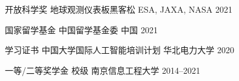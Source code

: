 


\begin{cvhonors}

  \cvhonor
    {开放科学奖} %
    {地球观测仪表板黑客松} %
    {ESA, JAXA, NASA} %
    {2021} %

  \cvhonor
    {国家留学基金} %
    {中国留学基金委} %
    {中国} %
    {2021} %

  \cvhonor
    {学习证书} %
    {中国大学国际人工智能培训计划} %
    {华北电力大学} %
    {2020} %


  \cvhonor
    {一等/二等奖学金} %
    {校级} %
    {南京信息工程大学} %
    {2014--2021} %

\end{cvhonors}
